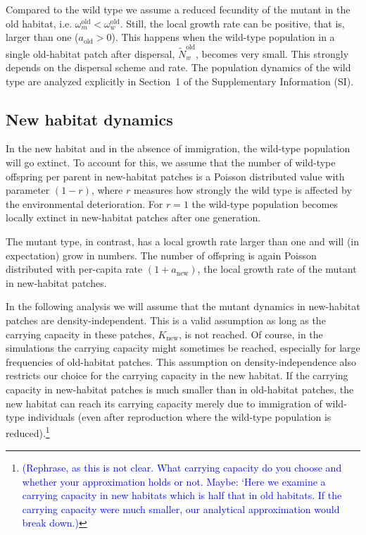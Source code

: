 \documentclass[a4paper,11pt]{article}
\newcommand{\francois}[1]{\textcolor{blue}{(#1)}}
\newcommand{\chg}[1]{\textcolor{change}{#1}}
\begin{document}
\chg{Compared to the wild type we assume a reduced fecundity of the mutant in the old habitat, i.e. $\omega^\text{old}_m<\omega^\text{old}_w$. Still, the local growth rate can be positive, that is, larger than one ($a_{\text{old}}>0$).} This happens when the \chg{wild-type population in a single old-habitat patch after dispersal,} $\widetilde{N}^{\text{old}}_w$, becomes very small. This strongly depends on the dispersal scheme and rate. \chg{The population dynamics of the wild type are analyzed explicitly in Section~1 of the Supplementary Information (SI).}

\subsection*{New habitat dynamics}
In the new habitat and in the absence of immigration, the wild-type population will go extinct. To account for this, we assume that the number of wild-type offspring \chg{per parent} in new-habitat patches is a Poisson distributed value with parameter $(1-r)$, where $r$ measures how strongly the wild type is affected by the environmental deterioration. For $r=1$ the wild-type population becomes locally extinct in new-habitat patches after one generation.

The mutant type, in contrast, has a local growth rate larger than one and will (in expectation) grow in numbers. The number of offspring is again Poisson distributed with per-capita rate $(1+a_{\text{new}})$, the local growth rate of the mutant in new-habitat patches. 

\chg{In the following analysis we will assume that the mutant dynamics in new-habitat patches are density-independent. This is a valid assumption as long as the carrying capacity in these patches, $K_{\text{new}}$, is not reached. Of course, in the simulations the carrying capacity might sometimes be reached, especially for large frequencies of old-habitat patches. This assumption on density-independence also restricts our choice for the carrying capacity in the new habitat. If the carrying capacity in new-habitat patches is much smaller than in old-habitat patches, the new habitat can reach its carrying capacity merely due to immigration of wild-type individuals (even after reproduction where the wild-type population is reduced).\footnote{\francois{Rephrase, as this is not clear. What carrying capacity do you choose and whether your approximation holds or not. Maybe: `Here we examine a carrying capacity in new habitats which is half that in old habitats. If the carrying capacity were much smaller, our analytical approximation would break down.}}}
\end{document}
